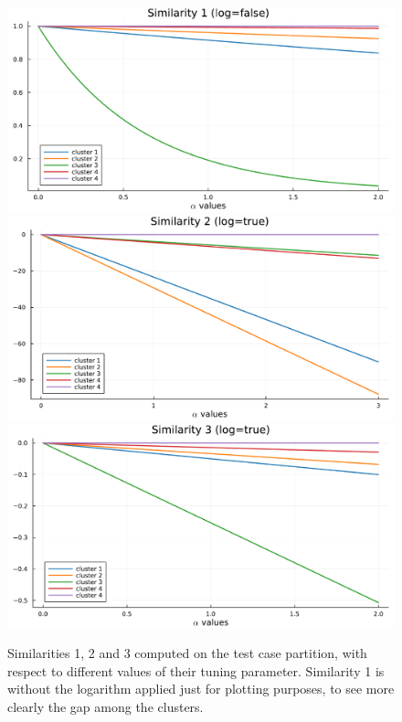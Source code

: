 \documentclass[12pt,	%
	a4paper,		%
	twoside,		%
	openright,		%
	titlepage,%
	]{book}
\theoremstyle{definition}
\begin{document}
\begin{figure}[!p]
    \centering
    \includegraphics[width=1\linewidth]{model description/covariate similarity analysis//test case on 5 clusters/similarity1_log_false.pdf}
    \includegraphics[width=1\linewidth]{model description/covariate similarity analysis//test case on 5 clusters/similarity2.pdf}
    \includegraphics[width=1\linewidth]{model description/covariate similarity analysis//test case on 5 clusters/similarity3.pdf}
    \caption[Similarities 1, 2 and 3 illustration]{Similarities 1, 2 and 3 computed on the test case partition, with respect to different values of their tuning parameter. Similarity 1 is without the logarithm applied just for plotting purposes, to see more clearly the gap among the clusters.}
    \label{fig: sim123}
\end{figure}
\end{document}
